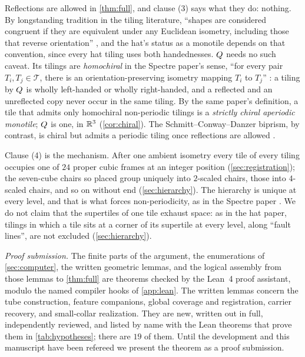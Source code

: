 Reflections are allowed in \cref{thm:full}, and clause (3) says what they do: nothing. By
longstanding tradition in the tiling literature, ``shapes are considered congruent if they are
equivalent under any Euclidean isometry, including those that reverse orientation''
\cite{SMKGS24}, and the hat's status as a monotile depends on that convention, since every hat
tiling uses both handednesses. $Q$ needs no such caveat. Its tilings are \emph{homochiral}
in the Spectre paper's sense, ``for every pair $T_i,T_j\in\mathcal{T}$, there is an
orientation-preserving isometry mapping $T_i$ to $T_j$'' \cite{SMKGS24b}: a tiling by $Q$ is
wholly left-handed or wholly right-handed, and a reflected and an unreflected copy never occur in
the same tiling. By the same paper's definition, a tile that admits only homochiral non-periodic
tilings is a \emph{strictly chiral aperiodic monotile}; $Q$ is one, in $\mathbb{R}^3$
(\cref{cor:chiral}). The
Schmitt--Conway--Danzer biprism, by contrast, is chiral but admits a periodic tiling once
reflections are allowed \cite{ST12}.

Clause (4) is the mechanism. After one ambient isometry every tile of every tiling occupies one
of $24$ proper cubic frames at an integer position (\cref{sec:registration}); the seven-cube
chairs so placed group uniquely into $2$-scaled chairs, those into $4$-scaled chairs, and so on
without end (\cref{sec:hierarchy}). The hierarchy is unique at every level, and that is what
forces non-periodicity, as in the Spectre paper \cite{SMKGS24b}. We do not claim that the
supertiles of one tile exhaust space: as in the hat paper, tilings in which a tile sits at a
corner of its supertile at every level, along ``fault lines'', are not excluded
(\cref{sec:hierarchy}).

\emph{Proof submission.} The finite parts of the argument, the enumerations of
\cref{sec:computer}, the written geometric lemmas, and the logical assembly from those lemmas to
\cref{thm:full} are theorems checked by the Lean~4 proof assistant, modulo the named compiler
hooks of \cref{app:lean}. The written lemmas concern the tube construction, feature companions,
global coverage and registration, carrier recovery, and small-collar realization. They are new,
written out in full, independently reviewed, and listed by name with the Lean theorems that
prove them in \cref{tab:hypotheses}; there are $19$ of them. Until the development and this
manuscript have been refereed we present the theorem as a proof submission.

